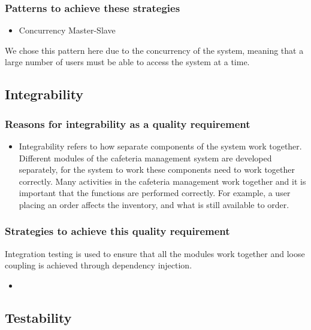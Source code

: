 \documentclass[a4paper,12pt]{article}
\begin{document}
\subsubsection{Patterns to achieve these strategies}
\begin{itemize}
\item Concurrency Master-Slave 
\end{itemize}
We chose this pattern here due to the concurrency of the system, meaning that a large number of users must be able to access the system at a time.

\subsection{Integrability}
\subsubsection{Reasons for integrability as a quality requirement}
\begin{itemize}
\item  Integrability refers to how separate components of the system work together. Different modules of the cafeteria management system are developed separately, for the system to work these components need to work together correctly. Many activities in the cafeteria management work together and it is important that the functions are performed correctly. For example, a user placing an order affects the inventory, and what is still available to order.
\end{itemize}

\subsubsection{Strategies to achieve this quality requirement}
Integration testing is used to ensure that all the modules work together and loose coupling is achieved through dependency injection.
\begin{itemize}
\item 
\end{itemize}



\subsection{Testability}
\end{document}
